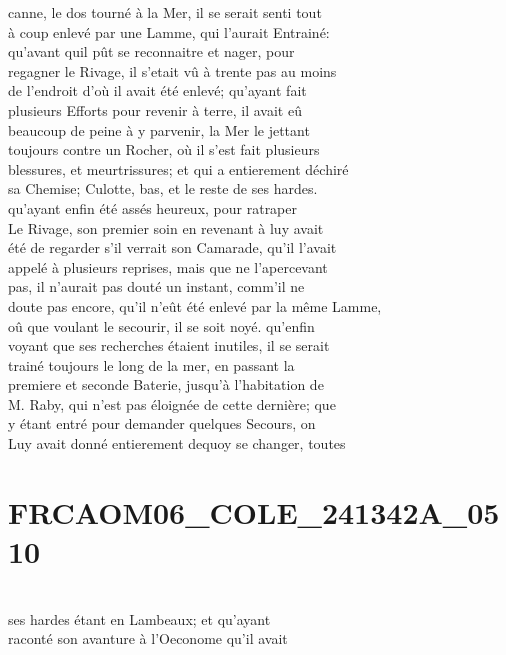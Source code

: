 \documentclass{article}
\begin{document}
\begin{pages}
canne, le dos tourné à la Mer, il se serait senti tout\\
à coup enlevé par une Lamme, qui l'aurait Entrainé:\\
qu'avant quil pût se reconnaitre et nager, pour\\
regagner le Rivage, il s'etait vû à trente pas au moins\\
de l'endroit d'où il avait été enlevé; qu'ayant fait\\
plusieurs Efforts pour revenir à terre, il avait eû\\
beaucoup de peine à y parvenir, la Mer le jettant\\
toujours contre un Rocher, où il s'est fait plusieurs\\
blessures, et meurtrissures; et qui a entierement déchiré\\
sa Chemise; Culotte, bas, et le reste de ses hardes.\\
qu'ayant enfin été assés heureux, pour ratraper\\
Le Rivage, son premier soin en revenant à luy avait\\
été de regarder s'il verrait son Camarade, qu'il l'avait\\
appelé à plusieurs reprises, mais que ne l'apercevant\\
pas, il n'aurait pas douté un instant, comm'il ne\\
doute pas encore, qu'il n'eût été enlevé par la même Lamme,\\
oû que voulant le secourir, il se soit noyé. qu'enfin\\
voyant que ses recherches étaient inutiles, il se serait\\
trainé toujours le long de la mer, en passant la\\
premiere et seconde Baterie, jusqu'à l'habitation de\\
M. Raby, qui n'est pas éloignée de cette dernière; que\\
y étant entré pour demander quelques Secours, on\\
Luy avait donné entierement dequoy se changer, toutes
\pend
\endnumbering\beginnumbering\section{FRCAOM06\_COLE\_241342A\_0510}\pstart
\\
ses hardes étant en Lambeaux; et qu'ayant\\
raconté son avanture à l'Oeconome qu'il avait\\

\end{pages}
\end{document}
